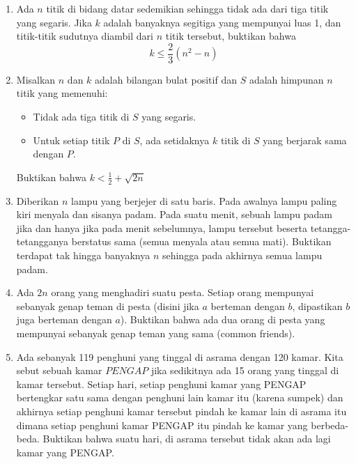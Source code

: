 \documentclass[12pt]{scrartcl}
\begin{document}
\begin{enumerate}
	\item 
	Ada  $n$ titik di bidang datar sedemikian sehingga tidak ada dari tiga titik yang segaris. 
	Jika $k$ adalah banyaknya segitiga yang mempunyai luas 1, dan titik-titik sudutnya diambil dari $n$ titik tersebut, buktikan bahwa 
	\[
	k \leq \frac{2}{3}(n^2-n)
	\]
	
	\item
	Misalkan $n$ dan $k$ adalah bilangan bulat positif dan $S$ adalah himpunan $n$ titik yang memenuhi:
	\begin{itemize}
		\item Tidak ada tiga titik di $S$ yang segaris.
		
		\item Untuk setiap titik $P$ di $S$, ada setidaknya $k$ titik di $S$ yang berjarak sama dengan $P$.
	\end{itemize}
	Buktikan bahwa $k < \frac{1}{2} + \sqrt{2n}$
	
	\item
	Diberikan $n$ lampu yang berjejer di satu baris. Pada awalnya lampu paling kiri menyala dan sisanya padam. Pada suatu menit, sebuah lampu padam jika dan hanya jika pada menit sebelumnya, lampu tersebut beserta tetangga-tetangganya berstatus sama (semua menyala atau semua mati). Buktikan terdapat tak hingga banyaknya $n$ sehingga pada akhirnya semua lampu padam.
	
	\item
	Ada $2n$ orang yang menghadiri suatu pesta. Setiap orang mempunyai sebanyak genap teman di pesta (disini jika $a$ berteman dengan $b$, dipastikan $b$ juga berteman dengan $a$). Buktikan bahwa ada dua orang di pesta yang mempunyai sebanyak genap teman yang sama (common friends).
	
	\item
	Ada sebanyak 119 penghuni yang tinggal di asrama dengan 120 kamar. Kita sebut sebuah kamar $\textit{PENGAP}$ jika sedikitnya ada 15 orang yang tinggal di kamar tersebut. Setiap hari, setiap penghuni kamar yang PENGAP bertengkar satu sama dengan penghuni lain kamar itu (karena sumpek) dan akhirnya setiap penghuni kamar tersebut pindah ke kamar lain di asrama itu dimana setiap penghuni kamar PENGAP itu pindah ke kamar yang berbeda-beda. Buktikan bahwa suatu hari, di asrama tersebut tidak akan ada lagi kamar yang PENGAP.
\end{enumerate}
\end{document}

